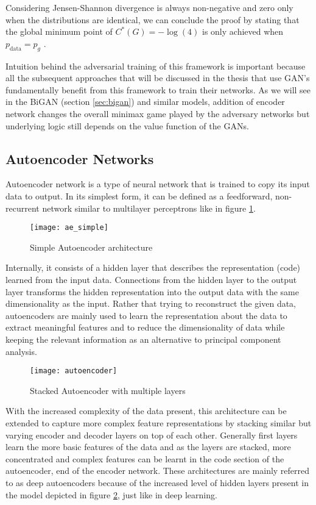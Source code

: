 Considering Jensen-Shannon divergence is always non-negative and zero only when the distributions
are identical, we can conclude the proof by stating that the global minimum point of $C^*(G) = -
\log(4)$ is only achieved when $p_{\text{data}} = p_g$ .

Intuition behind the adversarial training of this framework is important because all the subsequent
approaches that will be discussed in the thesis that use GAN's fundamentally benefit from this
framework to train their networks. As we will see in the BiGAN (section \ref{sec:bigan}) and similar models, addition of
encoder network changes the overall minimax game played by the adversary networks but underlying
logic still depends on the value function of the GANs.

\subsection{Autoencoder Networks}
\label{sec:ae}
 
Autoencoder network is a type of neural network that is trained to copy its input data to output.
\cite{Goodfellow-et-al-2016} In its simplest form, it can be defined as a feedforward, non-
recurrent network similar to multilayer perceptrons like in figure \ref{fig:ae_simple}.
\begin{figure}[h!]
	\centering
	\texttt{[image: ae\_simple]}
    \caption{Simple Autoencoder architecture}
    \label{fig:ae_simple}
\end{figure}
Internally, it consists of a hidden layer that describes the representation (code) learned from the
input data. Connections from the hidden layer to the output layer transforms the hidden
representation into the output data with the same dimensionality as the input. Rather that trying to
reconstruct the given data, autoencoders are mainly used to learn the representation about the data
to extract meaningful features and to reduce the dimensionality of data while keeping the
relevant information as an alternative to principal component analysis. 

\begin{figure}[h!]
	\centering
	\texttt{[image: autoencoder]}
    \caption{Stacked Autoencoder with multiple layers}
    \label{fig:ae_deep}
\end{figure}

With the increased complexity of the data present, this architecture can be extended to capture more
complex feature representations by stacking similar but varying encoder and decoder layers on top of
each other. Generally first layers learn the more basic features of the data and as the layers are
stacked, more concentrated and complex features can be learnt in the code section of the
autoencoder, end of the encoder network. These architectures are mainly referred to as deep
autoencoders because of the increased level of hidden layers present in the model depicted in figure
\ref{fig:ae_deep}, just like in deep learning.

